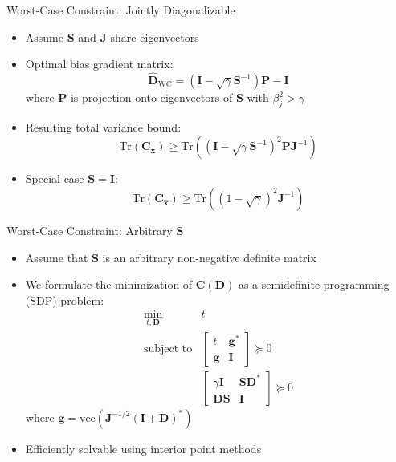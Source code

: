 \documentclass{beamer}
\begin{document}
\begin{frame}{Worst-Case Constraint: Jointly Diagonalizable}
\begin{itemize}
\item Assume $\mathbf{S}$ and $\mathbf{J}$ share eigenvectors
\item Optimal bias gradient matrix:
\[ \hat{\mathbf{D}}_{\text{WC}} = (\mathbf{I} - \sqrt{\gamma}\mathbf{S}^{-1})\mathbf{P} - \mathbf{I} \]
where $\mathbf{P}$ is projection onto eigenvectors of $\mathbf{S}$ with $\beta_j^2 > \gamma$
\item Resulting total variance bound:
\[ \text{Tr}(\mathbf{C}_{\hat{\mathbf{x}}}) \geq \text{Tr}((\mathbf{I} - \sqrt{\gamma}\mathbf{S}^{-1})^2\mathbf{P}\mathbf{J}^{-1}) \]
\item Special case $\mathbf{S} = \mathbf{I}$:
\[ \text{Tr}(\mathbf{C}_{\hat{\mathbf{x}}}) \geq \text{Tr}((1 - \sqrt{\gamma})^2\mathbf{J}^{-1}) \]
\end{itemize}
\end{frame}

\begin{frame}{Worst-Case Constraint: Arbitrary $\mathbf{S}$}
\begin{itemize}
\item Assume that $\mathbf{S}$ is an arbitrary non-negative definite matrix
\item We formulate the minimization of $\mathbf{C}(\mathbf{D})$ as a semidefinite programming (SDP) problem:
\begin{align*}
\min_{t,\mathbf{D}} & t \\
\text{subject to} & \begin{bmatrix}
t & \mathbf{g}^* \\
\mathbf{g} & \mathbf{I}
\end{bmatrix} \succeq 0 \\
& \begin{bmatrix}
\gamma\mathbf{I} & \mathbf{S}\mathbf{D}^* \\
\mathbf{D}\mathbf{S} & \mathbf{I}
\end{bmatrix} \succeq 0
\end{align*}
where $\mathbf{g} = \text{vec}(\mathbf{J}^{-1/2}(\mathbf{I} + \mathbf{D})^*)$
\item Efficiently solvable using interior point methods
\end{itemize}
\end{frame}
\end{document}
